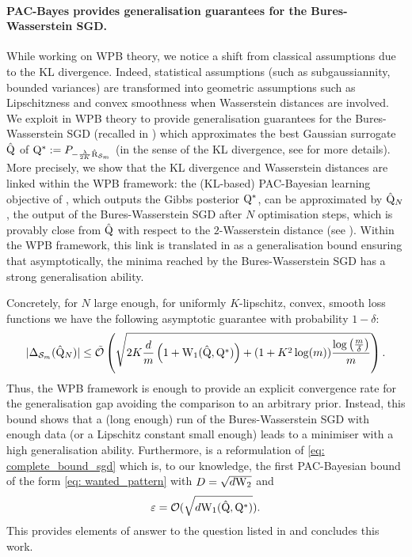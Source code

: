 \paragraph{PAC-Bayes provides generalisation guarantees for the Bures-Wasserstein SGD.}
While working on WPB theory, we notice a shift from classical assumptions due to the KL divergence. Indeed, statistical assumptions (such as subgaussiannity, bounded variances) are transformed into geometric assumptions such as Lipschitzness and convex smoothness when Wasserstein distances are involved. We exploit in  WPB theory to provide generalisation guarantees for the Bures-Wasserstein SGD (recalled in ) which approximates the best Gaussian surrogate $\hat{\mathrm{Q}}$ of $\mathrm{Q}^*:= P_{-\frac{\lambda}{2K}\hat{\text{R}}_{\mathcal{S}_m}}$ (in the sense of the KL divergence, see  for more details).
More precisely, we show that the KL divergence and Wasserstein distances are linked within the WPB framework: the (KL-based) PAC-Bayesian learning objective of \citet{catoni2007pac}, which outputs the Gibbs posterior $\mathrm{Q}^*$, can be approximated by $\hat{\mathrm{Q}}_N$, the output of the Bures-Wasserstein SGD after $N$ optimisation steps, which is provably close from $\hat{\mathrm{Q}}$ with respect to the $2$-Wasserstein distance (see ).
Within the WPB framework, this link is translated in  as a generalisation bound ensuring that asymptotically, the minima reached by the Bures-Wasserstein SGD has a strong generalisation ability.
\medskip

Concretely, for $N$ large enough, for uniformly $K$-lipschitz, convex, smooth loss functions we have the following asymptotic guarantee with probability $1-\delta$:
\begin{align*}
|\Delta_{\mathcal{S}_m}(\hat{\mathrm{Q}}_N)|  \leq\Tilde{\mathcal{O}}\left( \sqrt{2K\frac{d}{m}\left(1 + \mathrm{W}_{1}(\hat{\mathrm{Q}},\mathrm{Q}^*)\right)+ (1+K^2\log(m)) \frac{\log\left( \frac{m}{\delta} \right)}{m}} \right).
\end{align*}
Thus, the WPB framework is enough to provide an explicit convergence rate for the generalisation gap avoiding the comparison to an arbitrary prior. Instead, this bound shows that a (long enough) run of the Bures-Wasserstein SGD with enough data (or a Lipschitz constant small enough) leads to a minimiser with a high generalisation ability. Furthermore,  is a reformulation of \eqref{eq: complete_bound_sgd} which is, to our knowledge, the first PAC-Bayesian bound of the form \eqref{eq: wanted_pattern} with $D=\sqrt{d \mathrm{W}_{2}}$ and $$\varepsilon= \mathcal{O}(\sqrt{d\mathrm{W}_{1}(\hat{\mathrm{Q}},\mathrm{Q}^*)}).$$
This provides elements of answer to the question listed in  and concludes this work.


